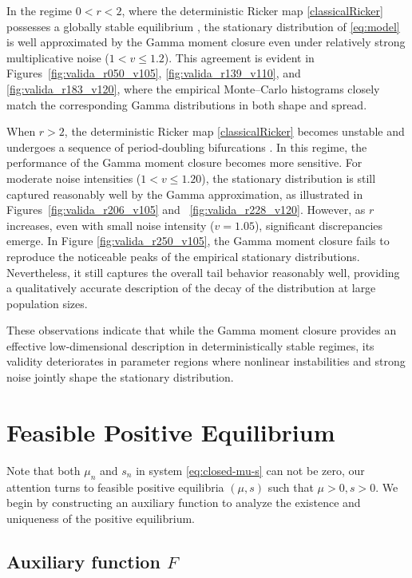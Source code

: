 \documentclass[12pt]{article}
\theoremstyle{definition}
\begin{document}
In the regime \(0<r<2\), where the deterministic Ricker map \eqref{classicalRicker} possesses a globally stable equilibrium \cite{may1976simple}, the stationary distribution of \eqref{eq:model} is well approximated by the Gamma moment closure even under relatively strong multiplicative noise (\(1<v \leq 1.2\)). This agreement is evident in Figures~\ref{fig:valida_r050_v105}, \ref{fig:valida_r139_v110}, and \ref{fig:valida_r183_v120}, where the empirical Monte--Carlo histograms closely match the corresponding Gamma distributions in both shape and spread.

When \(r>2\), the deterministic Ricker map \eqref{classicalRicker} becomes unstable and undergoes a sequence of period-doubling bifurcations \cite{may1976simple}. In this regime, the performance of the Gamma moment closure becomes more sensitive. For moderate noise intensities (\(1<v \leq 1.20\)), the stationary distribution is still captured reasonably well by the Gamma approximation, as illustrated in Figures~\ref{fig:valida_r206_v105} and ~\ref{fig:valida_r228_v120}. However, as $r$ increases,  even with small noise intensity (\(v =1.05\)), significant discrepancies emerge. In Figure \ref{fig:valida_r250_v105}, the Gamma moment closure fails to reproduce the noticeable peaks of the empirical stationary distributions. Nevertheless, it still captures the overall tail behavior reasonably well, providing a qualitatively accurate description of the decay of the distribution at large population sizes.

These observations indicate that while the Gamma moment closure provides an effective low-dimensional description in deterministically stable regimes, its validity deteriorates in parameter regions where nonlinear instabilities and strong noise jointly shape the stationary distribution.

\section{Feasible Positive Equilibrium}\label{feasb}

Note that both $\mu_n$ and $s_n$ in system \eqref{eq:closed-mu-s} can not be zero, our attention turns to feasible positive equilibria $(\mu,s)$ such that $\mu>0,s>0$. We begin by constructing an auxiliary function to analyze the existence and uniqueness of the positive equilibrium. 


\subsection{Auxiliary function $F$}
\end{document}
